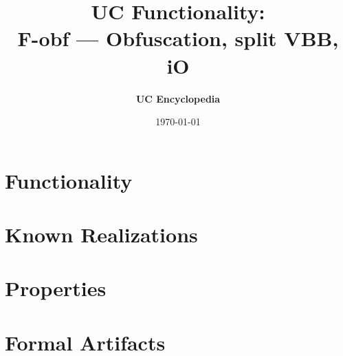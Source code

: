 \documentclass[11pt,a4paper]{article}
\title{\textbf{\Large UC Functionality:}\\[0.2em] \Large F-obf --- Obfuscation, split VBB, iO}
\author{\textbf{UC Encyclopedia}}
\date{\today}
\newtheorem{functionality}{Functionality}
\begin{document}
\maketitle

\begin{abstract}
\end{abstract}

\section{Functionality}

%

\section{Known Realizations}


\section{Properties}


\section{Formal Artifacts}

\end{document}
